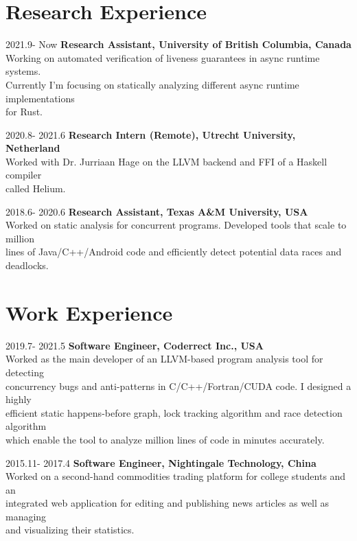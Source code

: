 \documentclass[12pt,letterpaper]{report}
\begin{document}

\section*{Research Experience}
\begin{tablist}[style=multiline, leftmargin=*]
	\item[2021.9- Now]
	\tab \textbf{Research Assistant, University of British Columbia, Canada}\\
	\tab Working on automated verification of liveness guarantees in async runtime systems. \\
	\tab Currently I'm focusing on statically analyzing different async runtime implementations \\
	\tab for Rust.
	\item[2020.8- 2021.6]
	\tab \textbf{Research Intern (Remote), Utrecht University, Netherland}\\
	\tab Worked with Dr. Jurriaan Hage on the LLVM backend and FFI of a Haskell compiler \\
	\tab called Helium.
	\item[2018.6- 2020.6]
	\tab \textbf{Research Assistant, Texas A\&M University, USA}\\
	\tab Worked on static analysis for concurrent programs. Developed tools that scale to million\\
	\tab lines of Java/C++/Android code and efficiently detect potential data races and deadlocks.
\end{tablist}


\section*{Work Experience}

\begin{tablist}[style=multiline, leftmargin=*]
	\item[2019.7- 2021.5]
	\tab \textbf{Software Engineer, Coderrect Inc., USA}\\
	\tab Worked as the main developer of an LLVM-based program analysis tool for detecting\\
	\tab concurrency bugs and anti-patterns in C/C++/Fortran/CUDA code. I designed a highly\\
	\tab efficient static happens-before graph, lock tracking algorithm and race detection algorithm\\
	\tab which enable the tool to analyze million lines of code in minutes accurately.
	\item[2015.11- 2017.4]
	\tab \textbf{Software Engineer, Nightingale Technology, China}\\
	\tab Worked on a second-hand commodities trading platform for college students and an\\
	\tab integrated web application for editing and publishing news articles as well as managing\\
	\tab and visualizing their statistics.
\end{tablist}
\end{document}

